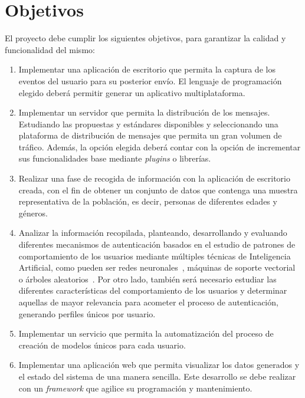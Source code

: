 \section{Objetivos}
\label{sec:intro:objetivos}

El proyecto debe cumplir los siguientes objetivos, para garantizar la calidad y funcionalidad del mismo:

\begin{enumerate}[noitemsep]
    
    \item Implementar una aplicación de escritorio que permita la captura de los eventos del usuario para su posterior envío. El lenguaje de programación elegido deberá permitir generar un aplicativo multiplataforma.
    
    \item Implementar un servidor que permita la distribución de los mensajes. Estudiando las propuestas y estándares disponibles y  seleccionando una plataforma de distribución de mensajes que permita un gran volumen de tráfico. Además, la opción elegida deberá contar con la opción de incrementar sus funcionalidades base mediante \textit{plugins} o librerías.
    
    \item Realizar una fase de recogida de información con la aplicación de escritorio creada, con el fin de obtener un conjunto de datos que contenga una muestra representativa de la población, es decir, personas de diferentes edades y géneros.
    
    \item Analizar la información recopilada, planteando, desarrollando y evaluando diferentes mecanismos de autenticación basados en el estudio de patrones de comportamiento de los usuarios mediante múltiples técnicas de Inteligencia Artificial, como pueden ser redes neuronales~\cite{werbos2008foreword}, máquinas de soporte vectorial~\cite{cortes1995support} o árboles aleatorios~\cite{Breiman2001}. Por otro lado, también será necesario estudiar las diferentes características del comportamiento de los usuarios y determinar aquellas de mayor relevancia para acometer el proceso de autenticación, generando perfiles únicos por usuario.
    
    \item Implementar un servicio que permita la automatización del proceso de creación de modelos únicos para cada usuario.
    
    \item Implementar una aplicación web que permita visualizar los datos generados y el estado del 
    sistema de una manera sencilla. Este desarrollo se debe realizar con un \textit{framework} que agilice su programación y mantenimiento.  

\end{enumerate}

